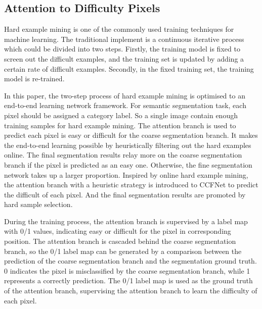 \documentclass[10.5pt,compsoc]{TsT}
\theoremstyle{mystyle}
\begin{document}
{%


\subsection{Attention to Difficulty Pixels}
\label{s:attention}
\noindent


Hard example mining is one of the commonly used training techniques for machine learning.
The traditional implement is a continuous iterative process which could be divided into two steps.
Firstly, the training model is fixed to screen out the difficult examples, and the training set is updated by adding a certain rate of difficult examples.
Secondly, in the fixed training set, the training model is re-trained.

In this paper, the two-step process of hard example mining is optimised to an end-to-end learning network framework.
For semantic segmentation task, each pixel should be assigned a category label.
So a single image contain enough training samples for hard example mining.
The attention branch is used to predict each pixel is easy or difficult for the coarse segmentation branch.
It makes the end-to-end learning possible by heuristically filtering out the hard examples online.
The final segmentation results relay more on the coarse segmentation branch if the pixel is predicted as an easy one.
Otherwise, the fine segmentation network takes up a larger proportion.
Inspired by online hard example mining, the attention branch with a heuristic strategy is introduced to CCFNet to predict the difficult of each pixel.
And the final segmentation results are promoted by hard sample selection.

During the training process, the attention branch is supervised by a label map with 0/1 values, indicating  easy or difficult for the pixel in corresponding position.
The attention branch is cascaded behind the coarse segmentation branch, so the 0/1 label map can be generated by a comparison between the prediction of the coarse segmentation branch and the segmentation ground truth.
0 indicates the pixel is misclassified by the coarse segmentation branch, while 1 represents a correctly prediction.
The 0/1 label map is used as the ground truth of the attention branch, supervising the attention branch to learn the difficulty of each pixel.

}
\end{document}
